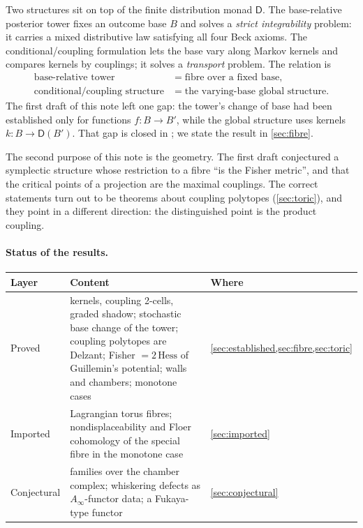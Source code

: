 \documentclass[11pt]{article}
\theoremstyle{definition}
\theoremstyle{remark}
\newcommand{\D}{\mathsf{D}}
\begin{document}
Two structures sit on top of the finite distribution monad $\D$. The base-relative posterior tower
\cite{Awasthi-Tower} fixes an outcome base $B$ and solves a \emph{strict integrability} problem: it
carries a mixed distributive law satisfying all four Beck axioms. The conditional/coupling formulation
\cite{Awasthi-Attribution} lets the base vary along Markov kernels and compares kernels by couplings;
it solves a \emph{transport} problem. The relation is
\begin{align*}
\text{base-relative tower}&=\text{fibre over a fixed base},\\
\text{conditional/coupling structure}&=\text{the varying-base global structure}.
\end{align*}
The first draft of this note left one gap: the tower's change of base had been established only for
functions $f\colon B\to B'$, while the global structure uses kernels $k\colon B\to\D(B')$. That gap is
closed in \cite[\S9.7]{Awasthi-Tower}; we state the result in \cref{sec:fibre}.

The second purpose of this note is the geometry. The first draft conjectured a symplectic structure
whose restriction to a fibre ``is the Fisher metric'', and that the critical points of a projection are
the maximal couplings. The correct statements turn out to be theorems about coupling polytopes
(\cref{sec:toric}), and they point in a different direction: the distinguished point is the product
coupling.

\paragraph{Status of the results.}
\begin{center}\small
\begin{tabular}{@{}R{0.2\textwidth}R{0.48\textwidth}R{0.22\textwidth}@{}}
\toprule
Layer & Content & Where\\
\midrule
Proved & kernels, coupling 2-cells, graded shadow; stochastic base change of the tower; coupling
polytopes are Delzant; Fisher $=2\,\mathrm{Hess}$ of Guillemin's potential; walls and chambers;
monotone cases & \cref{sec:established,sec:fibre,sec:toric}\\
Imported & Lagrangian torus fibres; nondisplaceability and Floer cohomology of the special fibre in the
monotone case & \cref{sec:imported}\\
Conjectural & families over the chamber complex; whiskering defects as $A_\infty$-functor data; a
Fukaya-type functor & \cref{sec:conjectural}\\
\bottomrule
\end{tabular}
\end{center}
\end{document}
